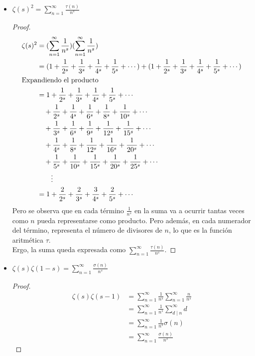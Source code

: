 \documentclass[12pt]{article}
\begin{document}
\begin{itemize}
    \item $\zeta(s)^2 = \sum_{n = 1}^{\infty} \frac{\tau(n)}{n^s}$
    \begin{proof}
    \begin{align*}
        \zeta(s)^2
            &= (\sum_{n=1}^{\infty} \frac{1}{n^s}) (\sum_{n=1}^{\infty} \frac{1}{n^s})\\
            &= (1 + \frac{1}{2^s} + \frac{1}{3^s} + \frac{1}{4^s} + \frac{1}{5^s} + \cdots)
             + (1 + \frac{1}{2^s} + \frac{1}{3^s} + \frac{1}{4^s} + \frac{1}{5^s} + \cdots)\\
            \intertext{Expandiendo el producto}
            &= 1 + \frac{1}{2^s} + \frac{1}{3^s} + \frac{1}{4^s} + \frac{1}{5^s} + \cdots \\
                & \quad + \frac{1}{2^s} + \frac{1}{4^s} + \frac{1}{6^s} + \frac{1}{8^s} + \frac{1}{10^s} + \cdots \\
                & \quad + \frac{1}{3^s} + \frac{1}{6^s} + \frac{1}{9^s} + \frac{1}{12^s} + \frac{1}{15^s} + \cdots \\
                & \quad + \frac{1}{4^s} + \frac{1}{8^s} + \frac{1}{12^s} + \frac{1}{16^s} + \frac{1}{20^s} + \cdots \\
                & \quad + \frac{1}{5^s} + \frac{1}{10^s} + \frac{1}{15^s} + \frac{1}{20^s} + \frac{1}{25^s} + \cdots \\
                & \qquad \vdots  \\
            &= 1 + \frac{2}{2^s} + \frac{2}{3^s} + \frac{3}{4^s} + \frac{2}{5^s} + \cdots \\
    \end{align*}
    Pero se observa que en cada término $\frac{1}{n^s}$ en la suma va a ocurrir tantas veces como $n$ pueda
    representarse como producto. Pero además, en cada numerador del término, representa el número de divisores 
    de $n$, lo que es la función aritmética $\tau$.\\
    Ergo, la suma queda expresada como $\sum_{n=1}^{\infty}\frac{\tau(n)}{n^s}$.
    \end{proof}

    \item $\zeta(s) \zeta(1-s) = \sum_{n = 1}^{\infty} \frac{\sigma(n)}{n^s}$
    \begin{proof}
    \begin{align*}
        \zeta(s) \zeta(s-1) 
            &= \sum_{n=1}^{\infty} \frac{1}{n^s} \sum_{n=1}^{\infty} \frac{n}{n^s} \\
            &= \sum_{n=1}^{\infty} \frac{1}{n^s} \sum_{d \mid n}^{\infty} d \\
            &= \sum_{n=1}^{\infty} \frac{1}{n^s} \sigma(n) \\
            &= \sum_{n=1}^{\infty} \frac{\sigma(n)}{n^s}
    \end{align*}
    \end{proof}


\end{itemize}
\end{document}
